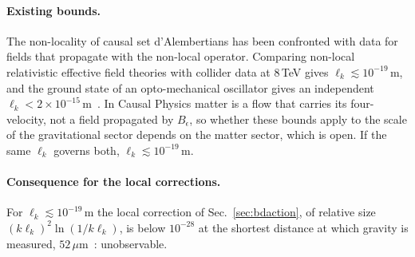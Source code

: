 \paragraph{Existing bounds.} The non-locality of causal set d'Alembertians has been confronted with data
for fields that propagate with the non-local operator. Comparing non-local relativistic effective field
theories with collider data at $8$\,TeV gives $\ell_k\lesssim10^{-19}$\,m, and the ground state of an
opto-mechanical oscillator gives an independent $\ell_k<2\times10^{-15}$\,m~\cite{Belenchia2016opto}.
In Causal Physics matter is a flow that carries its four-velocity, not a field propagated by $B_\epsilon$,
so whether these bounds apply to the scale of the gravitational sector depends on the matter sector,
which is open. If the same $\ell_k$ governs both, $\ell_k\lesssim10^{-19}$\,m. 

\paragraph{Consequence for the local corrections.} For $\ell_k\lesssim10^{-19}$\,m the local correction of
Sec.~\ref{sec:bdaction}, of relative size $(k\ell_k)^2\ln(1/k\ell_k)$, is below $10^{-28}$ at the shortest
distance at which gravity is measured, $52\,\mu$m~\cite{Lee2020}: unobservable.

